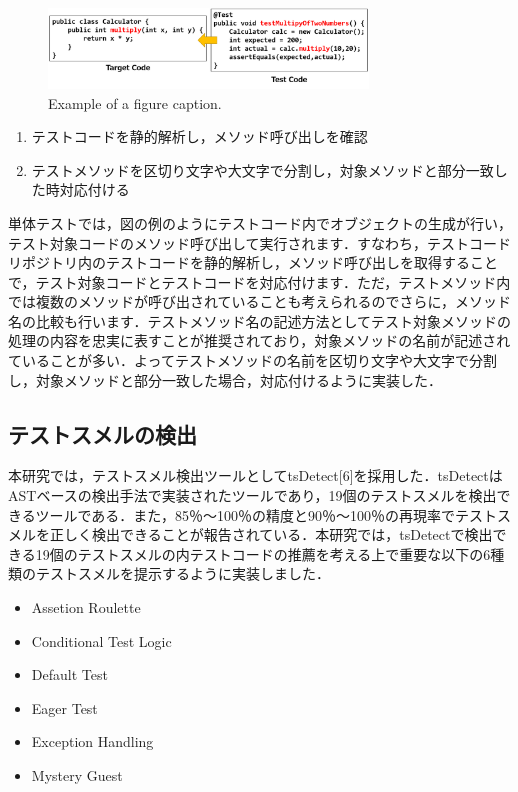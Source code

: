 \documentclass[conference]{IEEEtran}
\begin{document}
\begin{figure}[htbp]
\centerline{\includegraphics[width=8.5cm]{mapping.pdf}}
\caption{Example of a figure caption.}
\label{fig}
\end{figure}

\begin{enumerate}
\renewcommand{\labelenumi}{(\arabic{enumi})}
\item テストコードを静的解析し，メソッド呼び出しを確認
\item テストメソッドを区切り文字や大文字で分割し，対象メソッドと部分一致した時対応付ける
\end{enumerate}

単体テストでは，図の例のようにテストコード内でオブジェクトの生成が行い，テスト対象コードのメソッド呼び出して実行されます．すなわち，テストコードリポジトリ内のテストコードを静的解析し，メソッド呼び出しを取得することで，テスト対象コードとテストコードを対応付けます．ただ，テストメソッド内では複数のメソッドが呼び出されていることも考えられるのでさらに，メソッド名の比較も行います．テストメソッド名の記述方法としてテスト対象メソッドの処理の内容を忠実に表すことが推奨されており，対象メソッドの名前が記述されていることが多い．よってテストメソッドの名前を区切り文字や大文字で分割し，対象メソッドと部分一致した場合，対応付けるように実装した．

\subsection{テストスメルの検出}
本研究では，テストスメル検出ツールとしてtsDetect[6]を採用した．tsDetectはASTベースの検出手法で実装されたツールであり，19個のテストスメルを検出できるツールである．また，85％〜100％の精度と90％〜100％の再現率でテストスメルを正しく検出できることが報告されている．本研究では，tsDetectで検出できる19個のテストスメルの内テストコードの推薦を考える上で重要な以下の6種類のテストスメルを提示するように実装しました．

\begin{itemize}
\item Assetion Roulette
\item Conditional Test Logic
\item Default Test
\item Eager Test
\item Exception Handling
\item Mystery Guest
\end{itemize}
\end{document}
